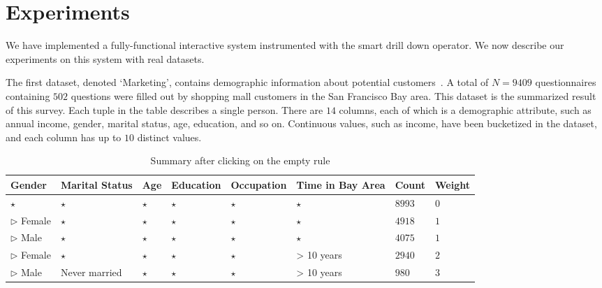 
\section{Experiments}\label{sec:experiments}
We have implemented a fully-functional interactive system instrumented with the smart drill down operator.
We now describe our experiments on this system with real datasets.

 The first dataset, denoted `Marketing', contains demographic information about potential customers~\cite{dataset1}. A total of $N=9409$ questionnaires containing $502$ questions were filled out by shopping mall customers in the San Francisco Bay area. This dataset is the summarized result of this survey. Each tuple in the table describes a single person. There are $14$ columns, each of which is a demographic attribute, such as annual income, gender, marital status, age, education, and so on. Continuous values, such as income, have been bucketized in the dataset, and each column has up to $10$ distinct values. 
\begin{table} 
\centering 
\scriptsize
\begin{tabular}{| p{1.5cm} | p{1.5cm} | p{1.5cm} | p{1.5cm} | p{1.5cm} | p{1.5cm} | l | l |} 
\hline Gender & Marital Status & Age & Education & Occupation & Time in Bay Area & Count & Weight \\ \hline 
\cline{1-8} $\star$ & $\star$ & $\star$ & $\star$ & $\star$ & $\star$ & $8993$ & $0$ \\
\cline{1-1} \cline{2-2} \cline{3-3} \cline{4-4} \cline{5-5} \cline{6-6} \cline{7-8} $\triangleright$ Female & $\star$ & $\star$ & $\star$ & $\star$ & $\star$ & $4918$ & $1$ \\
\cline{1-1} \cline{2-2} \cline{3-3} \cline{4-4} \cline{5-5} \cline{6-6} \cline{7-8} $\triangleright$ Male & $\star$ & $\star$ & $\star$ & $\star$ & $\star$ & $4075$ & $1$ \\
\cline{1-1} \cline{2-2} \cline{3-3} \cline{4-4} \cline{5-5} \cline{6-6} \cline{7-8} $\triangleright$ Female & $\star$ & $\star$ & $\star$ & $\star$ & > 10 years & $2940$ & $2$ \\
\cline{1-1} \cline{2-2} \cline{3-3} \cline{4-4} \cline{5-5} \cline{6-6} \cline{7-8} $\triangleright$ Male & Never married & $\star$ & $\star$ & $\star$ & > 10 years & $980$ & $3$ \\
\hline 
\end{tabular} 
\vspace{-10pt}
\caption{Summary after clicking on the empty rule \label{table:uiexample1}} 
\vspace{-10pt}
\end{table} 
